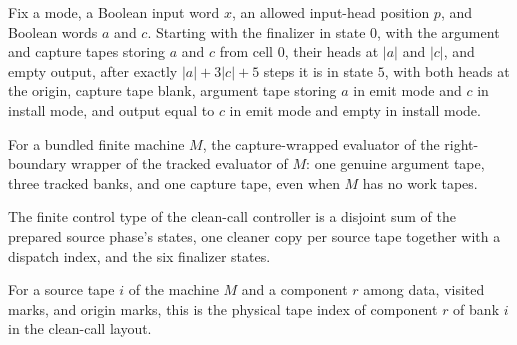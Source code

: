 \begin{lemma}
\label{Turing.FinTM.emCall_finish_run}
\leanok
{}
Fix a mode, a Boolean input word $x$, an allowed input-head position $p$, and Boolean
words $a$ and $c$. Starting with the finalizer in state $0$, with the argument and
capture tapes storing $a$ and $c$ from cell $0$, their heads at $|a|$ and $|c|$, and
empty output, after exactly $|a|+3|c|+5$ steps it is in state $5$, with both heads at
the origin, capture tape blank, argument tape storing $a$ in emit mode and $c$ in
install mode, and output equal to $c$ in emit mode and empty in install mode.
\end{lemma}

\begin{definition}
\label{Turing.FinTM.emCallSource}
\leanok
{}
For a bundled finite machine $M$, the capture-wrapped evaluator of the right-boundary
wrapper of the tracked evaluator of $M$: one genuine argument tape, three tracked banks,
and one capture tape, even when $M$ has no work tapes.
\end{definition}

\begin{definition}
\label{Turing.FinTM.emCallState}
\leanok
{}
The finite control type of the clean-call controller is a disjoint sum of the prepared
source phase's states, one cleaner copy per source tape together with a dispatch index,
and the six finalizer states.
\end{definition}

\begin{definition}
\label{Turing.FinTM.emCallTripleIndex}
\leanok
{}
For a source tape $i$ of the machine $M$ and a component $r$ among data, visited marks,
and origin marks, this is the physical tape index of component $r$ of bank $i$ in the
clean-call layout.
\end{definition}

